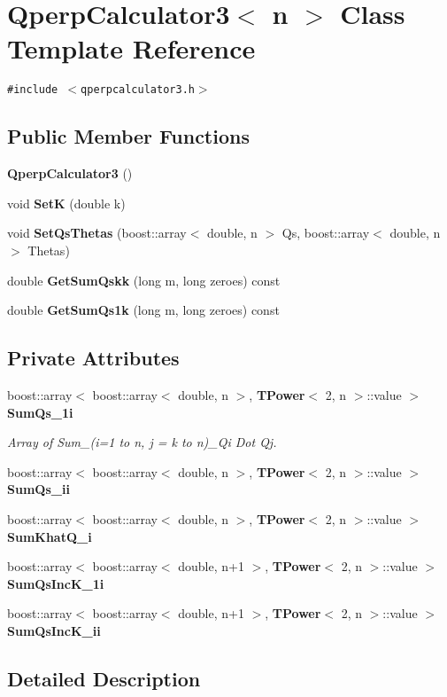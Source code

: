 \section{QperpCalculator3$<$ n $>$ Class Template Reference}
\label{classQperpCalculator3}
{\tt \#include $<$qperpcalculator3.h$>$}

\subsection*{Public Member Functions}
\begin{CompactItemize}
\item 
{\bf QperpCalculator3} ()
\item 
void {\bf SetK} (double k)
\item 
void {\bf SetQsThetas} (boost::array$<$ double, n $>$ Qs, boost::array$<$ double, n $>$ Thetas)
\item 
double {\bf GetSumQskk} (long m, long zeroes) const 
\item 
double {\bf GetSumQs1k} (long m, long zeroes) const 
\end{CompactItemize}
\subsection*{Private Attributes}
\begin{CompactItemize}
\item 
boost::array$<$ boost::array$<$ double, n $>$, {\bf TPower}$<$ 2, n $>$::value $>$ {\bf SumQs\_\-1i}
\begin{CompactList}\small\item\em Array of Sum\_\-(i=1 to n, j = k to n)\_\-Qi Dot Qj. \item\end{CompactList}\item 
boost::array$<$ boost::array$<$ double, n $>$, {\bf TPower}$<$ 2, n $>$::value $>$ {\bf SumQs\_\-ii}
\item 
boost::array$<$ boost::array$<$ double, n $>$, {\bf TPower}$<$ 2, n $>$::value $>$ {\bf SumKhatQ\_\-i}
\item 
boost::array$<$ boost::array$<$ double, n+1 $>$, {\bf TPower}$<$ 2, n $>$::value $>$ {\bf SumQsIncK\_\-1i}
\item 
boost::array$<$ boost::array$<$ double, n+1 $>$, {\bf TPower}$<$ 2, n $>$::value $>$ {\bf SumQsIncK\_\-ii}
\end{CompactItemize}


\subsection{Detailed Description}
